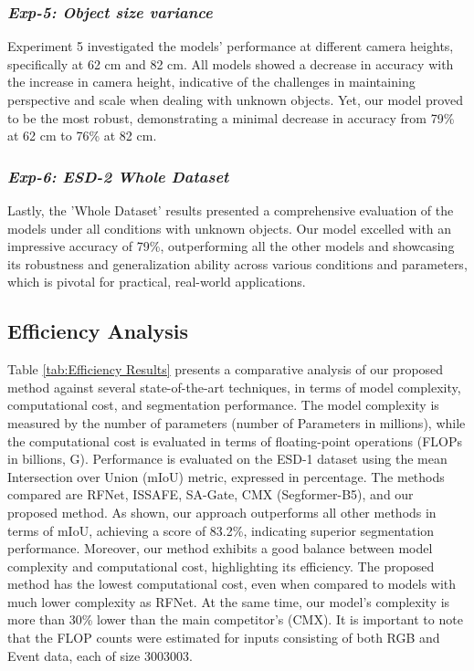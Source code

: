 \documentclass[lettersize,journal]{IEEEtran}
\begin{document}
\subsubsection{\textbf{\textit{Exp-5: Object size variance}}} 
\label{subsubsection : size variance results}

Experiment 5 investigated the models' performance at different camera heights, specifically at 62 cm and 82 cm. All models showed a decrease in accuracy with the increase in camera height, indicative of the challenges in maintaining perspective and scale when dealing with unknown objects. Yet, our model proved to be the most robust, demonstrating a minimal decrease in accuracy from 79\% at 62 cm to 76\% at 82 cm.



\subsubsection{\textbf{\textit{Exp-6: ESD-2 Whole Dataset}}} 
\label{subsubsection : Whole Dataset}


Lastly, the 'Whole Dataset' results presented a comprehensive evaluation of the models under all conditions with unknown objects. Our model excelled with an impressive accuracy of 79\%, outperforming all the other models and showcasing its robustness and generalization ability across various conditions and parameters, which is pivotal for practical, real-world applications.











\subsection{\textbf{Efficiency Analysis}}


Table \ref{tab:Efficiency Results} presents a comparative analysis of our proposed method against several state-of-the-art techniques, in terms of model complexity, computational cost, and segmentation performance. The model complexity is measured by the number of parameters  (number of Parameters in millions), while the computational cost is evaluated in terms of floating-point operations (FLOPs in billions, G). Performance is evaluated on the ESD-1 dataset using the mean Intersection over Union (mIoU) metric, expressed in percentage. The methods compared are RFNet, ISSAFE, SA-Gate, CMX (Segformer-B5), and our proposed method. As shown, our approach outperforms all other methods in terms of mIoU, achieving a score of 83.2\%, indicating superior segmentation performance. Moreover, our method exhibits a good balance between model complexity and computational cost, highlighting its efficiency. The proposed method has the lowest computational cost, even when compared to models with much lower complexity as RFNet. At the same time, our model's complexity is more than 30\% lower than the main competitor's (CMX). It is important to note that the FLOP counts were estimated for inputs consisting of both RGB and Event data, each of size 3003003.
\end{document}
